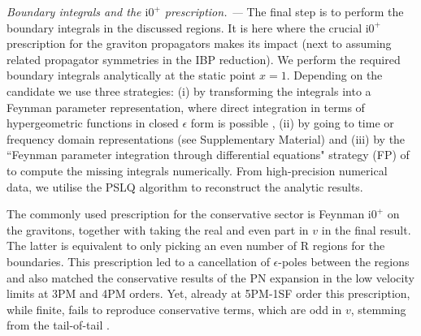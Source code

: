 \documentclass[twocolumn,superscriptaddress,amsmath, amssymb, amsfonts,preprintnumbers,aps,prd,longbibliography,nofootinbib]{revtex4-2}
\renewcommand{\sec}[1]{\textit{#1. --- }}
\renewcommand{\i}{\ensuremath{\mathrm{i}}}
\newcommand{\iO}{\i 0^{+}}
\begin{document}
\sec{Boundary integrals and the $\iO$ prescription}
The final step is to perform the boundary integrals in the discussed regions. It is here where the crucial $\iO$ prescription for the graviton propagators makes its impact (next to assuming related propagator symmetries in the IBP reduction). We perform the required boundary integrals analytically at the static point $x=1$. Depending on the candidate we use three strategies: (i)
{ by transforming the integrals into a Feynman parameter representation, where direct integration in terms of hypergeometric functions in closed $\epsilon$ form is possible \cite{Driesse:2024feo}, (ii) by going to time \cite{Driesse:2024feo} or frequency domain representations (see Supplementary Material)} and (iii) by the ``Feynman parameter integration through differential equations" strategy (FP) of \cite{Hidding:2022ycg} to compute the missing integrals numerically. From high-precision numerical data, we utilise the PSLQ algorithm \cite{Ferguson1999PSLQ} to reconstruct the analytic results.

The commonly used prescription for the conservative sector is Feynman $\iO$ on the gravitons, together with taking the real and even part in $v$ in the final result. The latter is equivalent to only picking an even number of R regions for the boundaries. This prescription led to a cancellation of $\epsilon$-poles between the regions and also matched the conservative results of the PN expansion in the low velocity limits at 3PM and 4PM orders. Yet, already at 5PM-1SF order \cite{Driesse:2024xad} this prescription, while finite, fails to reproduce conservative terms, which are odd in $v$, stemming from the tail-of-tail \cite{Dlapa:2025biy}.
\end{document}
